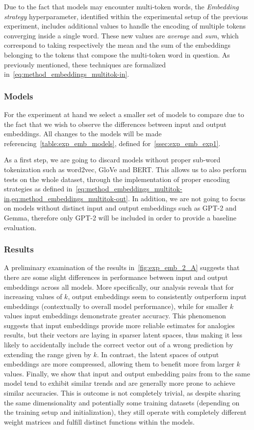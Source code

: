 Due to the fact that models may encounter multi-token words, the \emph{Embedding strategy} hyperparameter, identified within the experimental setup of the previous experiment, includes additional values to handle the encoding of multiple tokens converging inside a single word.
These new values are \emph{average} and \emph{sum}, which correspond to taking respectively the mean and the sum of the embeddings belonging to the tokens that compose the multi-token word in question.
As previously mentioned, these techniques are formalized in~\cref{eq:method_embeddings_multitok-in}.

\subsubsection{Models}\label{sssec:exp_emb_exp2_models}

For the experiment at hand we select a smaller set of models to compare due to the fact that we wish to observe the differences between input and output embeddings.
All changes to the models will be made referencing~\cref{table:exp_emb_models}, defined for~\cref{ssec:exp_emb_exp1}.

As a first step, we are going to discard models without proper sub-word tokenization such as word2vec, GloVe and BERT\@.
This allows us to also perform tests on the whole dataset, through the implementation of proper encoding strategies as defined in~\cref{eq:method_embeddings_multitok-in,eq:method_embeddings_multitok-out}.
In addition, we are not going to focus on models without distinct input and output embeddings such as GPT-2 and Gemma, therefore only GPT-2 will be included in order to provide a baseline evaluation.

\subsubsection{Results}

A preliminary examination of the results in~\cref{fig:exp_emb_2_A} suggests that there are some slight differences in performance between input and output embeddings across all models.
More specifically, our analysis reveals that for increasing values of $k$, output embeddings seem to consistently outperform input embeddings (contextually to overall model performance), while for smaller $k$ values input embeddings demonstrate greater accuracy.
This phenomenon suggests that input embeddings provide more reliable estimates for analogies results, but their vectors are laying in sparser latent spaces, thus making it less likely to accidentally include the correct vector out of a wrong prediction by extending the range given by $k$.
In contrast, the latent spaces of output embeddings are more compressed, allowing them to benefit more from larger $k$ values.
Finally, we show that input and output embedding pairs from to the same model tend to exhibit similar trends and are generally more prone to achieve similar accuracies.
This is outcome is not completely trivial, as despite sharing the same dimensionality and potentially some training datasets (depending on the training setup and initialization), they still operate with completely different weight matrices and fulfill distinct functions within the models.

